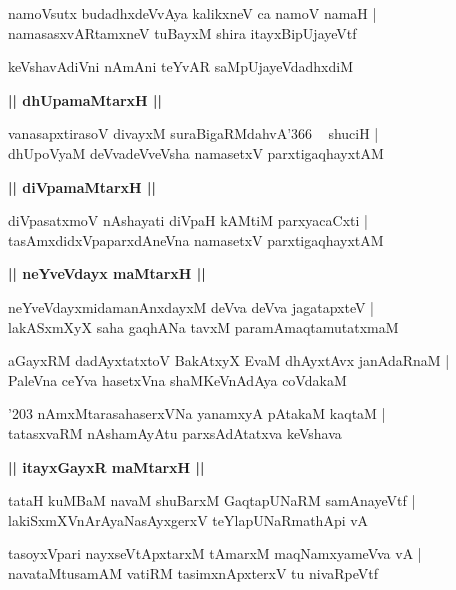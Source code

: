 \documentclass[twoside,12pt,openright]{book}
\newcounter{shloka}[chapter]
\def\uvaca#1{\centerline{{\large\textbf{#1}}}}
\begin{document}
\begin{shloka}%
namoVsutx budadhxdeVvAya kalikxneV ca namoV namaH |\\
namasasxvARtamxneV tuBayxM shira itayxBipUjayeVtf 
\end{shloka}

\begin{shloka}%
keVshavAdiVni nAmAni teYvAR saMpUjayeVdadhxdiM
\end{shloka}

\uvaca{|| dhUpamaMtarxH ||}

\begin{shloka}%
vanasapxtirasoV divayxM suraBigaRMdahvA\char'366 ~ shuciH |\\
dhUpoVyaM deVvadeVveVsha namasetxV parxtigaqhayxtAM 
\end{shloka}

\uvaca{|| diVpamaMtarxH ||}

\begin{shloka}%
diVpasatxmoV nAshayati diVpaH kAMtiM parxyacaCxti |\\
tasAmxdidxVpaparxdAneVna namasetxV parxtigaqhayxtAM
\end{shloka}

\uvaca{|| neYveVdayx maMtarxH ||}

\begin{shloka}%
neYveVdayxmidamanAnxdayxM deVva deVva jagatapxteV |\\
lakASxmXyX saha gaqhANa tavxM paramAmaqtamutatxmaM 
\end{shloka}

\begin{shloka}%
aGayxRM dadAyxtatxtoV BakAtxyX EvaM dhAyxtAvx janAdaRnaM |\\
PaleVna ceYva hasetxVna shaMKeVnAdAya coVdakaM 
\end{shloka}

\begin{shloka}%
\char'203 nAmxMtarasahaserxVNa yanamxyA pAtakaM kaqtaM |\\
tatasxvaRM nAshamAyAtu parxsAdAtatxva keVshava
\end{shloka}

\uvaca{|| itayxGayxR maMtarxH ||}

\begin{shloka}%
tataH kuMBaM navaM shuBarxM GaqtapUNaRM samAnayeVtf |\\
lakiSxmXVnArAyaNasAyxgerxV teYlapUNaRmathApi vA
\end{shloka}

\begin{shloka}%
tasoyxVpari nayxseVtApxtarxM tAmarxM maqNamxyameVva vA |\\
navataMtusamAM vatiRM tasimxnApxterxV tu nivaRpeVtf
\end{shloka}
\end{document}
